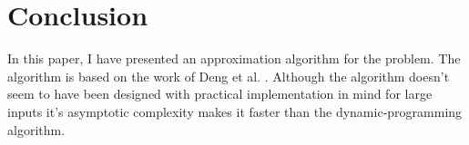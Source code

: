 \section{Conclusion}
In this paper, I have presented an approximation algorithm for the \Partition problem. The algorithm is based on the work of Deng et al. \cite{deng}. Although the algorithm doesn't seem to have been designed with practical implementation in mind for large inputs it's asymptotic complexity makes it faster than the dynamic-programming algorithm.